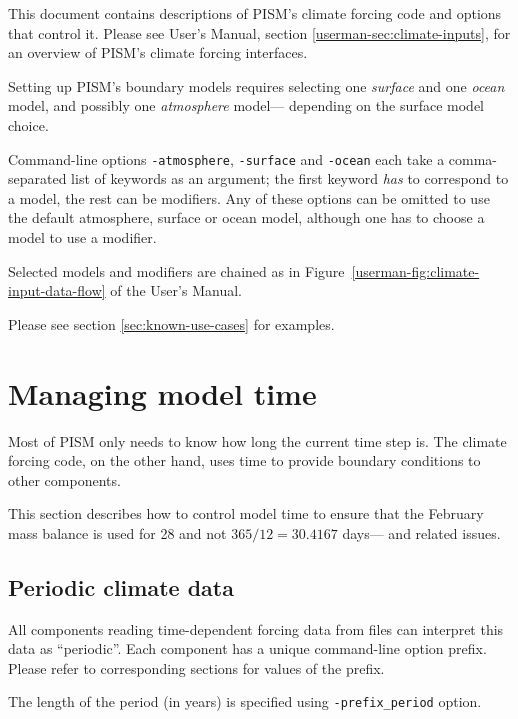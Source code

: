 \documentclass[titlepage,letterpaper,final]{scrartcl}
\begin{document}
This document contains descriptions of PISM's climate forcing code and options that control it. Please see User's Manual, section \ref*{userman-sec:climate-inputs}, for an overview of PISM's climate forcing interfaces.

Setting up PISM's boundary models requires selecting one \emph{surface} and one
\emph{ocean} model, and possibly one \emph{atmosphere} model--- depending on
the surface model choice.

Command-line options \texttt{-atmosphere}, \texttt{-surface} and
\texttt{-ocean} each take a comma-separated list of keywords as an argument;
the first keyword \emph{has} to correspond to a model, the rest can be
modifiers. Any of these options can be omitted to use the default atmosphere,
surface or ocean model, although one has to choose a model to use a modifier.

Selected models and modifiers are chained as in
Figure~\ref*{userman-fig:climate-input-data-flow} of the User's Manual.

Please see section \ref{sec:known-use-cases} for examples.

\section{Managing model time}
\label{sec:model-time}

Most of PISM only needs to know how long the current time step is. The climate
forcing code, on the other hand, uses time to provide boundary conditions to
other components.

This section describes how to control model time to ensure that the February
mass balance is used for 28 and not $365/12 = 30.4167$ days--- and related
issues.

\subsection{Periodic climate data}
\label{sec:periodic-forcing}


All components reading time-dependent forcing data from files can interpret
this data as ``periodic''. Each component has a unique command-line option
prefix. Please refer to corresponding sections for values of the prefix.

The length of the period (in years) is specified using \texttt{-prefix_period}
option.
\end{document}
